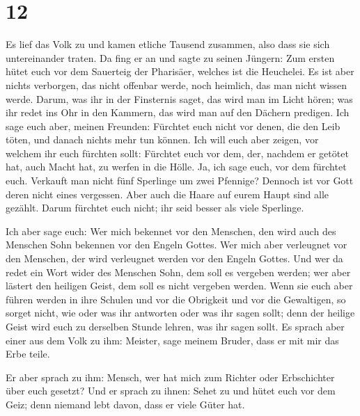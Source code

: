 \hypertarget{section-11}{%
\section{12}\label{section-11}}

 Es lief das Volk zu und kamen etliche Tausend zusammen,
also dass sie sich untereinander traten. Da fing er an und sagte zu
seinen Jüngern: Zum ersten hütet euch vor dem Sauerteig der Pharisäer,
welches ist die Heuchelei.  Es ist aber nichts verborgen,
das nicht offenbar werde, noch heimlich, das man nicht wissen werde.
 Darum, was ihr in der Finsternis saget, das wird man im
Licht hören; was ihr redet ins Ohr in den Kammern, das wird man auf den
Dächern predigen.  Ich sage euch aber, meinen Freunden:
Fürchtet euch nicht vor denen, die den Leib töten, und danach nichts
mehr tun können.  Ich will euch aber zeigen, vor welchem
ihr euch fürchten sollt: Fürchtet euch vor dem, der, nachdem er getötet
hat, auch Macht hat, zu werfen in die Hölle. Ja, ich sage euch, vor dem
fürchtet euch.  Verkauft man nicht fünf Sperlinge um zwei
Pfennige? Dennoch ist vor Gott deren nicht eines vergessen.
 Aber auch die Haare auf eurem Haupt sind alle gezählt.
Darum fürchtet euch nicht; ihr seid besser als viele Sperlinge.

 Ich aber sage euch: Wer mich bekennet vor den Menschen,
den wird auch des Menschen Sohn bekennen vor den Engeln Gottes.
 Wer mich aber verleugnet vor den Menschen, der wird
verleugnet werden vor den Engeln Gottes.  Und wer da
redet ein Wort wider des Menschen Sohn, dem soll es vergeben werden; wer
aber lästert den heiligen Geist, dem soll es nicht vergeben werden.
 Wenn sie euch aber führen werden in ihre Schulen und vor
die Obrigkeit und vor die Gewaltigen, so sorget nicht, wie oder was ihr
antworten oder was ihr sagen sollt;  denn der heilige
Geist wird euch zu derselben Stunde lehren, was ihr sagen sollt.
 Es sprach aber einer aus dem Volk zu ihm: Meister, sage
meinem Bruder, dass er mit mir das Erbe teile.

 Er aber sprach zu ihm: Mensch, wer hat mich zum Richter
oder Erbschichter über euch gesetzt?  Und er sprach zu
ihnen: Sehet zu und hütet euch vor dem Geiz; denn niemand lebt davon,
dass er viele Güter hat.

